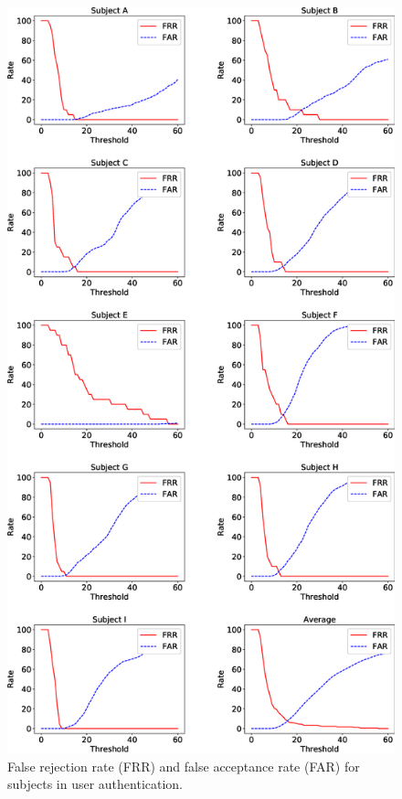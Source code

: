 \documentclass[sigchi,authordraft]{acmart}
\begin{document}
\begin{figure}[!t]
  \centering
    \includegraphics[width=1\linewidth]{figure/EER.eps}
  \caption{False rejection rate (FRR) and false acceptance rate (FAR) for subjects in user authentication.}
  \label{fig:EER}
\end{figure}
\end{document}
